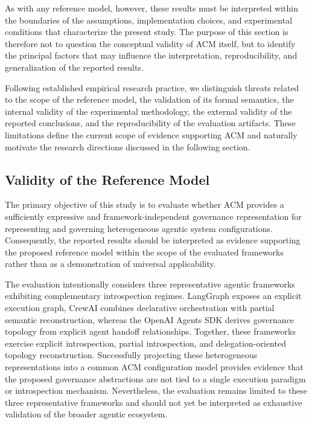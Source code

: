 \documentclass[10pt]{article}
\begin{document}
As with any reference model, however, these results must be interpreted within the boundaries of the assumptions, implementation choices, and experimental conditions that characterize the present study. The purpose of this section is therefore not to question the conceptual validity of ACM itself, but to identify the principal factors that may influence the interpretation, reproducibility, and generalization of the reported results.

Following established empirical research practice, we distinguish threats related to the scope of the reference model, the validation of its formal semantics, the internal validity of the experimental methodology, the external validity of the reported conclusions, and the reproducibility of the evaluation artifacts. These limitations define the current scope of evidence supporting ACM and naturally motivate the research directions discussed in the following section.

\subsection{Validity of the Reference Model}
\label{sec:validity_reference_model}

The primary objective of this study is to evaluate whether ACM provides a sufficiently expressive and framework-independent governance representation for representing and governing heterogeneous agentic system configurations. Consequently, the reported results should be interpreted as evidence supporting the proposed reference model within the scope of the evaluated frameworks rather than as a demonstration of universal applicability.

The evaluation intentionally considers three representative agentic frameworks exhibiting complementary introspection regimes. LangGraph exposes an explicit execution graph, CrewAI combines declarative orchestration with partial semantic reconstruction, whereas the OpenAI Agents SDK derives governance topology from explicit agent handoff relationships. Together, these frameworks exercise explicit introspection, partial introspection, and delegation-oriented topology reconstruction. Successfully projecting these heterogeneous representations into a common ACM configuration model provides evidence that the proposed governance abstractions are not tied to a single execution paradigm or introspection mechanism. Nevertheless, the evaluation remains limited to these three representative frameworks and should not yet be interpreted as exhaustive validation of the broader agentic ecosystem.
\end{document}
